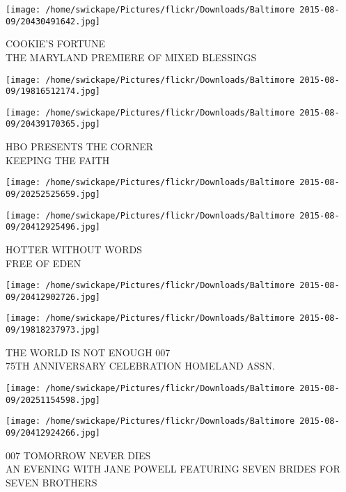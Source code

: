 \documentclass[10pt,letterpaper]{article}
\begin{document}
\vspace{0.25in}
\texttt{[image: /home/swickape/Pictures/flickr/Downloads/Baltimore 2015-08-09/20430491642.jpg]}

COOKIE'S FORTUNE\\
THE MARYLAND PREMIERE OF MIXED BLESSINGS\\
\pagebreak

\texttt{[image: /home/swickape/Pictures/flickr/Downloads/Baltimore 2015-08-09/19816512174.jpg]}

\vspace{0.25in}
\texttt{[image: /home/swickape/Pictures/flickr/Downloads/Baltimore 2015-08-09/20439170365.jpg]}

HBO PRESENTS THE CORNER\\
KEEPING THE FAITH\\
\pagebreak

\texttt{[image: /home/swickape/Pictures/flickr/Downloads/Baltimore 2015-08-09/20252525659.jpg]}

\vspace{0.25in}
\texttt{[image: /home/swickape/Pictures/flickr/Downloads/Baltimore 2015-08-09/20412925496.jpg]}

HOTTER WITHOUT WORDS\\
FREE OF EDEN\\
\pagebreak

\texttt{[image: /home/swickape/Pictures/flickr/Downloads/Baltimore 2015-08-09/20412902726.jpg]}

\vspace{0.25in}
\texttt{[image: /home/swickape/Pictures/flickr/Downloads/Baltimore 2015-08-09/19818237973.jpg]}

THE WORLD IS NOT ENOUGH 007\\
75TH ANNIVERSARY CELEBRATION HOMELAND ASSN.\\
\pagebreak

\texttt{[image: /home/swickape/Pictures/flickr/Downloads/Baltimore 2015-08-09/20251154598.jpg]}

\vspace{0.25in}
\texttt{[image: /home/swickape/Pictures/flickr/Downloads/Baltimore 2015-08-09/20412924266.jpg]}

007 TOMORROW NEVER DIES\\
AN EVENING WITH JANE POWELL FEATURING SEVEN BRIDES FOR SEVEN BROTHERS\\
\pagebreak
\end{document}
